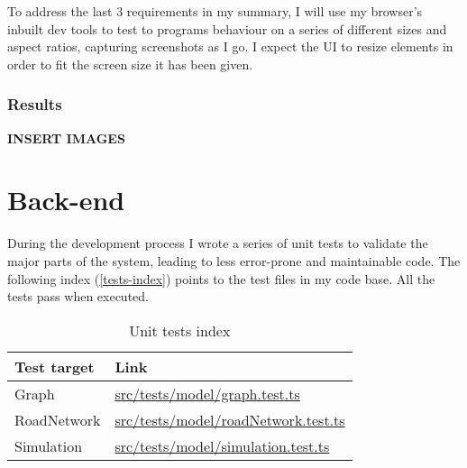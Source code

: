             To address the last 3 requirements in my summary, I will use my browser's inbuilt dev tools to test to programs behaviour on a series of different sizes and aspect ratios, capturing screenshots as I go. I expect the UI to resize elements in order to fit the screen size it has been given.

        \subsubsection{Results}

            \textbf{INSERT IMAGES}

\section{Back-end}

    During the development process I wrote a series of unit tests to validate the major parts of the system, leading to less error-prone and maintainable code. The following index (\autoref{tests-index}) points to the test files in my code base. All the tests pass when executed.

    \begin{table}[h]
        \begin{tabular}{|p{}|p{}|}
            \hline
            \textbf{Test target} & \textbf{Link}\\\hline
            Graph & \href{https://github.com/joshua-smart/traffic-simulator/blob/main/src/tests/model/graph.test.ts}{src/tests/model/graph.test.ts}\\\hline
            RoadNetwork & \href{https://github.com/joshua-smart/traffic-simulator/blob/main/src/tests/model/roadNetwork.test.ts}{src/tests/model/roadNetwork.test.ts}\\\hline
            Simulation & \href{https://github.com/joshua-smart/traffic-simulator/blob/main/src/tests/model/simulation.test.ts}{src/tests/model/simulation.test.ts}\\\hline
        \end{tabular}
        \caption{Unit tests index}
        \label{tests-index}
    \end{table}
